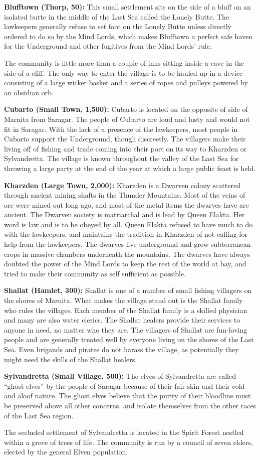 {
	\textbf{Blufftown (Thorp, 50):} This small settlement sits on the side of a bluff on an isolated butte in the middle of the Last Sea called the Lonely Butte. The lawkeepers generally refuse to set foot on the Lonely Butte unless directly ordered to do so by the Mind Lords, which makes Blufftown a perfect safe haven for the Underground and other fugitives from the Mind Lords' rule.

	The community is little more than a couple of inns sitting inside a cave in the side of a cliff. The only way to enter the village is to be hauled up in a device consisting of a large wicker basket and a series of ropes and pulleys powered by an obsidian orb.

	\textbf{Cubarto (Small Town, 1,500):} Cubarto is located on the opposite of side of Marnita from Saragar. The people of Cubarto are loud and lusty and would not fit in Saragar. With the lack of a presence of the lawkeepers, most people in Cubarto support the Underground, though discreetly. The villagers make their living off of fishing and trade coming into their port on its way to Kharzden or Sylvandretta. The village is known throughout the valley of the Last Sea for throwing a large party at the end of the year at which a large public feast is held.

	\textbf{Kharzden (Large Town, 2,000):} Kharzden is a Dwarven colony scattered through ancient mining shafts in the Thunder Mountains. Most of the veins of ore were mined out long ago, and most of the metal items the dwarves have are ancient. The Dwarven society is matriarchal and is lead by Queen Elakta. Her word is law and is to be obeyed by all. Queen Elakta refused to have much to do with the lawkeepers, and maintains the tradition in Kharzden of not calling for help from the lawkeepers. The dwarves live underground and grow subterranean crops in massive chambers underneath the mountains. The dwarves have always doubted the power of the Mind Lords to keep the rest of the world at bay, and tried to make their community as self sufficient as possible.

	\textbf{Shallat (Hamlet, 300):} Shallat is one of a number of small fishing villagers on the shores of Marnita. What makes the village stand out is the Shallat family who rules the villages. Each member of the Shallat family is a skilled physician and many are also water clerics. The Shallat healers provide their services to anyone in need, no matter who they are. The villagers of Shallat are fun-loving people and are generally treated well by everyone living on the shores of the Last Sea. Even brigands and pirates do not harass the village, as potentially they might need the skills of the Shallat healers.

	\textbf{Sylvandretta (Small Village, 500):} The elves of Sylvandretta are called ``ghost elves'' by the people of Saragar because of their fair skin and their cold and aloof nature. The ghost elves believe that the purity of their bloodline must be preserved above all other concerns, and isolate themselves from the other races of the Last Sea region.

	The secluded settlement of Sylvandretta is located in the Spirit Forest nestled within a grove of trees of life. The community is run by a council of seven elders, elected by the general Elven population.
}
